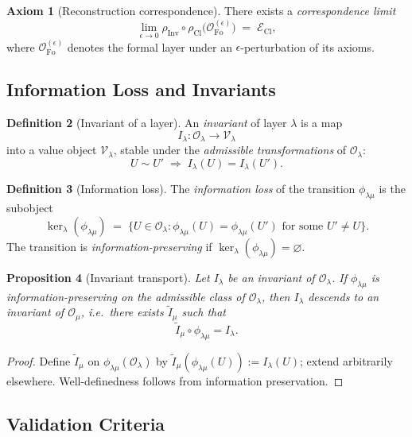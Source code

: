 \documentclass[11pt,a4paper]{article}
\theoremstyle{definition}
\newtheorem{definition}{Definition}[section]
\newtheorem{axiom}[definition]{Axiom}
\theoremstyle{plain}
\newtheorem{proposition}[definition]{Proposition}
\newcommand{\Fo}{\mathrm{Fo}}
\newcommand{\Cl}{\mathrm{Cl}}
\newcommand{\Inv}{\mathrm{Inv}}
\newcommand{\Ecal}{\mathcal{E}}
\newcommand{\Ocal}{\mathcal{O}}
\newcommand{\philam}{\phi_{\lambda\mu}}
\begin{document}
\begin{axiom}[Reconstruction correspondence]\label{ax:corr}
There exists a \emph{correspondence limit}
\[
  \lim_{\epsilon \to 0} \rho_\Inv \circ \rho_\Cl
  \bigl(\Ocal_\Fo^{(\epsilon)}\bigr)
  \;=\;
  \Ecal_\Cl ,
\]
where $\Ocal_\Fo^{(\epsilon)}$ denotes the formal layer under an
$\epsilon$-perturbation of its axioms.
\end{axiom}

\subsection{Information Loss and Invariants}

\begin{definition}[Invariant of a layer]
An \emph{invariant} of layer $\lambda$ is a map
\[
  I_\lambda : \Ocal_\lambda \to \mathcal{V}_\lambda
\]
into a value object $\mathcal{V}_\lambda$, stable under the
\emph{admissible transformations} of $\Ocal_\lambda$:
\[
  U \sim U' \;\Longrightarrow\; I_\lambda(U) = I_\lambda(U').
\]
\end{definition}

\begin{definition}[Information loss]
The \emph{information loss} of the transition $\philam$ is the
subobject
\[
  \ker_\lambda(\philam)
  \;=\;
  \{ U \in \Ocal_\lambda : \philam(U) = \philam(U') \text{ for some } U' \neq U \}.
\]
The transition is \emph{information-preserving} if
$\ker_\lambda(\philam) = \varnothing$.
\end{definition}

\begin{proposition}[Invariant transport]\label{prop:inv-transport}
Let $I_\lambda$ be an invariant of $\Ocal_\lambda$. If $\philam$ is
information-preserving on the admissible class of $\Ocal_\lambda$,
then $I_\lambda$ descends to an invariant of $\Ocal_\mu$, i.e.\ there
exists $\tilde{I}_\mu$ such that
\[
  \tilde{I}_\mu \circ \philam = I_\lambda .
\]
\end{proposition}

\begin{proof}
Define $\tilde{I}_\mu$ on $\philam(\Ocal_\lambda)$ by
$\tilde{I}_\mu(\philam(U)) := I_\lambda(U)$; extend arbitrarily
elsewhere. Well-definedness follows from information preservation.
\end{proof}

\subsection{Validation Criteria}
\end{document}
